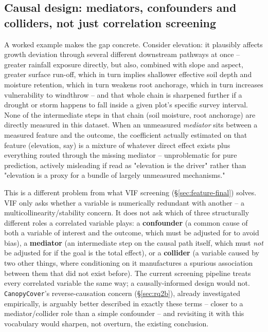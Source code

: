 \subsection{Causal design: mediators, confounders and colliders, not just correlation screening}
\label{sec:futurework-causal-design}

A worked example makes the gap concrete. Consider elevation: it plausibly affects growth deviation
through several different downstream pathways at once -- greater rainfall exposure directly, but
also, combined with slope and aspect, greater surface run-off, which in turn implies shallower
effective soil depth and moisture retention, which in turn weakens root anchorage, which in turn
increases vulnerability to windthrow -- and that whole chain is sharpened further if a drought or
storm happens to fall inside a given plot's specific survey interval. None of the intermediate
steps in that chain (soil moisture, root anchorage) are directly measured in this dataset. When an
unmeasured \emph{mediator} sits between a measured feature and the outcome, the coefficient
actually estimated on that feature (elevation, say) is a mixture of whatever direct effect exists
plus everything routed through the missing mediator -- unproblematic for pure prediction, actively
misleading if read as "elevation is the driver" rather than "elevation is a proxy for a bundle of
largely unmeasured mechanisms."

This is a different problem from what VIF screening (\S\ref{sec:feature-final}) solves. VIF only
asks whether a variable is numerically redundant with another -- a multicollinearity/stability
concern. It does not ask which of three structurally different roles a correlated variable plays:
a \textbf{confounder} (a common cause of both a variable of interest and the outcome, which must be
adjusted for to avoid bias), a \textbf{mediator} (an intermediate step on the causal path itself,
which must \emph{not} be adjusted for if the goal is the total effect), or a \textbf{collider} (a
variable caused by two other things, where conditioning on it manufactures a spurious association
between them that did not exist before). The current screening pipeline treats every correlated
variable the same way; a causally-informed design would not. \texttt{CanopyCover}'s
reverse-causation concern (\S\ref{sec:rq2b}), already investigated empirically, is arguably better
described in exactly these terms -- closer to a mediator/collider role than a simple confounder --
and revisiting it with this vocabulary would sharpen, not overturn, the existing conclusion.

